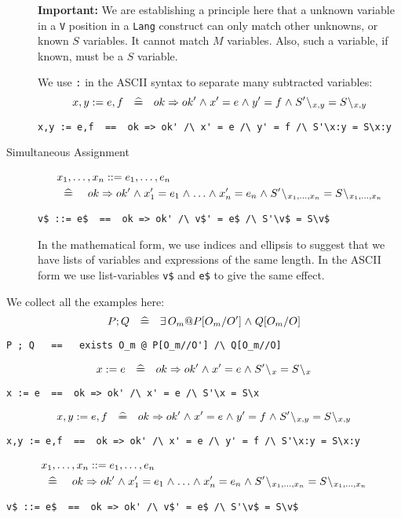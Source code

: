 \begin{description}
\textbf{Important:}
We are establishing a principle here that a unknown variable
in a \texttt{V} position in a \texttt{Lang} construct can only match other unknowns,
or known $S$ variables. It cannot match $M$ variables.
Also, such a variable, if known, must be a $S$ variable.
\par
We use \verb":" in the ASCII syntax to separate many subtracted variables:
$$
  x,y := e,f ~\defs~ ok \implies ok' \land x' = e \land y'=f
    \land S'\less{x,y} = S\less{x,y}
$$
\begin{verbatim}
x,y := e,f  ==  ok => ok' /\ x' = e /\ y' = f /\ S'\x:y = S\x:y
\end{verbatim}
\item[Simultaneous Assignment]
\begin{eqnarray*}
  \lefteqn{x_1,\ldots,x_n ::= e_1, \ldots , e_n}
\\ &\defs&
     ok \implies ok'
     \land x'_1 = e_1 \land \ldots \land x'_n = e_n
     \land S'\less{x_1,\ldots,x_n} = S\less{x_1,\ldots,x_n}
\end{eqnarray*}
\begin{verbatim}
v$ ::= e$  ==  ok => ok' /\ v$' = e$ /\ S'\v$ = S\v$
\end{verbatim}
In the mathematical form, we use indices and ellipsis
to suggest that we have lists of variables and expressions
of the same length.
In the ASCII form we use list-variables \verb"v$"
and \verb"e$" to give the same effect.
\end{description}

We collect all the examples here:
$$
  P ; Q ~\defs~ \exists O_m @ P[O_m/O'] \land Q[O_m/O]
$$
\begin{verbatim}
P ; Q   ==   exists O_m @ P[O_m//O'] /\ Q[O_m//O]
\end{verbatim}
$$
  x := e ~\defs~ ok \implies ok' \land x' = e
    \land S'\less x = S\less x
$$
\begin{verbatim}
x := e  ==  ok => ok' /\ x' = e /\ S'\x = S\x
\end{verbatim}
$$
  x,y := e,f ~\defs~ ok \implies ok' \land x' = e \land y'=f
    \land S'\less{x,y} = S\less{x,y}
$$
\begin{verbatim}
x,y := e,f  ==  ok => ok' /\ x' = e /\ y' = f /\ S'\x:y = S\x:y
\end{verbatim}
\begin{eqnarray*}
  \lefteqn{x_1,\ldots,x_n ::= e_1, \ldots , e_n}
\\ &\defs&
     ok \implies ok'
     \land x'_1 = e_1 \land \ldots \land x'_n = e_n
     \land S'\less{x_1,\ldots,x_n} = S\less{x_1,\ldots,x_n}
\end{eqnarray*}
\begin{verbatim}
v$ ::= e$  ==  ok => ok' /\ v$' = e$ /\ S'\v$ = S\v$
\end{verbatim}


